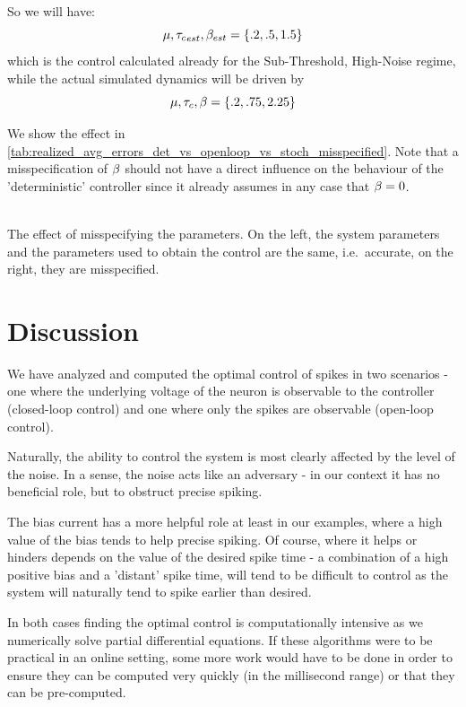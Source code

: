 \documentclass[12pt]{iopart}
\begin{document}
So we will have:
$$\mu, { \tau_{c} }_{est}, {\beta}_{est} = \{.2, .5, 1.5 \}$$ which is the control
calculated already for the Sub-Threshold,
High-Noise regime, while the actual simulated dynamics will be driven by
$$\mu, { \tau_{c} }, {\beta} = \{.2, .75, 2.25 \}$$

We show the effect in
\cref{tab:realized_avg_errors_det_vs_openloop_vs_stoch_misspecified}. Note that
a misspecification of ${\beta}$ should not have a direct influence on the behaviour
of the 'deterministic' controller since it already assumes in any case that ${\beta}=0$.
\begin{table}[h]
\begin{center}
 \\
 \caption{The effect of misspecifying the parameters. On the left, the
 system parameters and the parameters used to obtain the control are the
 same, i.e.\ accurate, on the right, they are misspecified.}
\label{tab:realized_avg_errors_det_vs_openloop_vs_stoch_misspecified}
\end{center}
\end{table}


\section{Discussion}
We have analyzed and computed the optimal control of spikes in two scenarios -
one where the underlying voltage of the neuron is observable to the controller
(closed-loop control) and one where only the spikes are observable (open-loop
control).

Naturally, the ability to control the system is most clearly affected by the
level of the noise. In a sense, the noise acts like an adversary - in our
context it has no beneficial role, but to obstruct precise spiking.

The bias current has a more helpful role at least in our examples, where a
high value of the bias tends to help precise spiking. Of course, where it helps
or hinders depends on the value of the desired spike time - a combination of a
high positive bias and a 'distant' spike time, will tend to be difficult to
control as the system will naturally tend to spike earlier than desired. 

In both cases finding the optimal control is computationally intensive as we
numerically solve partial differential equations. If these algorithms were to be
practical in an online setting, some more work would have to be done in order to
ensure they can be computed very quickly (in the millisecond range) or that
they can be pre-computed.
\end{document}
